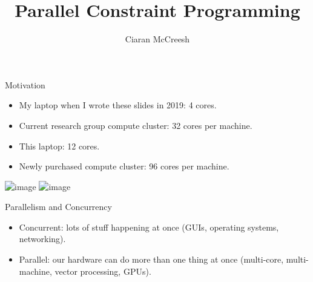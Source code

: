 \documentclass{beamer}
\title{Parallel Constraint Programming}
\author{Ciaran McCreesh}
\begin{document}
{
    \begin{frame}
        \titlepage
    \end{frame}
}

\begin{frame}[t]{Motivation}
    \begin{itemize}
        \item My laptop when I wrote these slides in 2019: 4 cores.
        \item Current research group compute cluster: 32 cores per machine.
        \item <2-> This laptop: 12 cores.
        \item <2-> Newly purchased compute cluster: 96 cores per machine.
    \end{itemize}

    \vfill
    \centering \includegraphics<1>[keepaspectratio=true,scale=0.08]{fatanode.png}
    \centering \includegraphics<2>[keepaspectratio=true,scale=0.15]{fatanode2.png}
\end{frame}

\begin{frame}{Parallelism and Concurrency}
    \begin{itemize}
        \item Concurrent: lots of stuff happening at once (GUIs, operating systems, networking).

        \item Parallel: our hardware can do more than one thing at once (multi-core, multi-machine,
            vector processing, GPUs).
    \end{itemize}
\end{frame}
\end{document}
